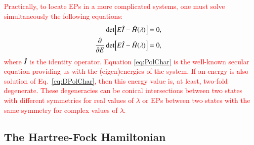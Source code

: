 \documentclass[aps,prb,reprint,noshowkeys,superscriptaddress]{revtex4-1}
\newcommand{\titou}[1]{\textcolor{red}{#1}}
\newcommand{\hI}{\Hat{I}}
\newcommand{\hH}{\Hat{H}}
\begin{document}
\titou{Practically, to locate EPs in a more complicated systems, one must solve simultaneously the following equations:\cite{Cejnar_2007}
\begin{subequations}
\begin{align}
	\label{eq:PolChar}
	\det[E\hI-\hH(\lambda)] & = 0,
	\\ 
	\label{eq:DPolChar}
	\pdv{E}\det[E\hI-\hH(\lambda)] & = 0,
\end{align}
\end{subequations}
where $\hI$ is the identity operator.
Equation \eqref{eq:PolChar} is the well-known secular equation providing us with the (eigen)energies of the system. 
If an energy is also solution of Eq.~\eqref{eq:DPolChar}, then this energy value is, at least, two-fold degenerate. 
These degeneracies can be conical intersections between two states with different symmetries for real values of $\lambda$ \cite{Yarkony_1996} or EPs between two states with the same symmetry for complex values of $\lambda$.}


\subsection{The Hartree-Fock Hamiltonian}
\end{document}
